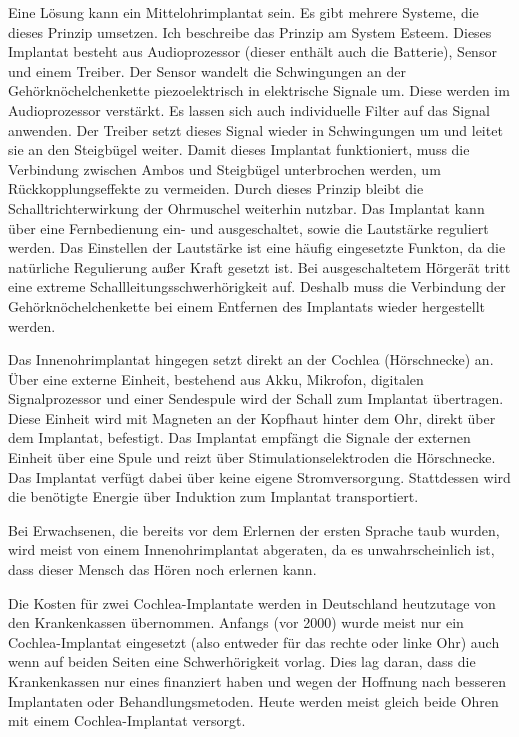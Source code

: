Eine Lösung kann ein Mittelohrimplantat sein. Es gibt mehrere Systeme, die dieses Prinzip umsetzen.
Ich beschreibe das Prinzip am System Esteem. Dieses Implantat besteht aus Audioprozessor (dieser
enthält auch die Batterie), Sensor und einem Treiber. Der Sensor wandelt die Schwingungen an der
Gehörknöchelchenkette piezoelektrisch in elektrische Signale um. Diese werden im Audioprozessor
verstärkt. Es lassen sich auch individuelle Filter auf das Signal anwenden. Der Treiber setzt dieses
Signal wieder in Schwingungen um und leitet sie an den Steigbügel weiter. Damit dieses Implantat
funktioniert, muss die Verbindung zwischen Ambos und Steigbügel unterbrochen werden, um
Rückkopplungseffekte zu vermeiden. Durch dieses Prinzip bleibt die
Schalltrichterwirkung der Ohrmuschel weiterhin nutzbar. Das Implantat
kann über eine Fernbedienung ein- und ausgeschaltet, sowie die Lautstärke reguliert werden. Das
Einstellen der Lautstärke ist eine häufig eingesetzte Funkton, da die natürliche
Regulierung außer Kraft gesetzt ist. Bei ausgeschaltetem Hörgerät tritt eine extreme
Schallleitungsschwerhörigkeit auf. Deshalb muss die Verbindung der Gehörknöchelchenkette bei einem
Entfernen des Implantats wieder hergestellt werden.

Das Innenohrimplantat hingegen setzt direkt an der Cochlea (Hörschnecke) an. Über eine externe
Einheit, bestehend aus Akku, Mikrofon, digitalen Signalprozessor und einer Sendespule wird der
Schall zum Implantat übertragen. Diese Einheit wird mit Magneten an der Kopfhaut hinter dem Ohr,
direkt über dem Implantat, befestigt. Das Implantat empfängt die Signale der externen Einheit über
eine Spule und reizt über Stimulationselektroden die Hörschnecke. Das Implantat verfügt dabei über
keine eigene Stromversorgung. Stattdessen wird die benötigte Energie über Induktion zum Implantat
transportiert.

Bei Erwachsenen, die bereits vor dem Erlernen der ersten Sprache taub wurden, wird meist von einem
Innenohrimplantat abgeraten, da es unwahrscheinlich ist, dass dieser Mensch das Hören noch erlernen
kann.

Die Kosten für zwei Cochlea-Implantate werden in Deutschland heutzutage von den Krankenkassen
übernommen. Anfangs (vor 2000) wurde meist nur ein Cochlea-Implantat eingesetzt (also entweder für
das rechte oder linke Ohr) auch wenn auf beiden Seiten eine Schwerhörigkeit vorlag. Dies lag daran,
dass die Krankenkassen nur eines finanziert haben und wegen der Hoffnung nach besseren Implantaten
oder Behandlungsmetoden. Heute werden meist gleich beide Ohren mit einem  Cochlea-Implantat versorgt.

